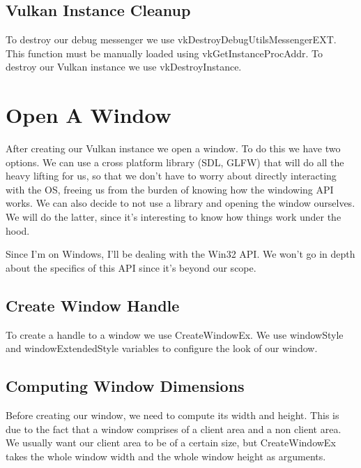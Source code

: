 \subsection{Vulkan Instance Cleanup}

To destroy our debug messenger we use vkDestroyDebugUtilsMessengerEXT.
This function must be manually loaded using vkGetInstanceProcAddr.
To destroy our Vulkan instance we use vkDestroyInstance.

\section{Open A Window}

After creating our Vulkan instance we open a window.
To do this we have two options.
We can use a cross platform library (SDL, GLFW) that will do all the heavy lifting
for us, so that we don't have to worry about directly interacting with the OS,
freeing us from the burden of knowing how the windowing API works.
We can also decide to not use a library and opening the window ourselves.
We will do the latter, since it's interesting to know how things work under the hood.

Since I'm on Windows, I'll be dealing with the Win32 API.
We won't go in depth about the specifics of this API since it's beyond our scope.

\subsection{Create Window Handle}

To create a handle to a window we use CreateWindowEx.
We use windowStyle and windowExtendedStyle variables to configure the look of
our window.

\begin{minipage}{\linewidth}{\noindent}
    
\end{minipage}

\subsection{Computing Window Dimensions}

Before creating our window, we need to compute its width and height.
This is due to the fact that a window comprises of a client area and a non client area.
We usually want our client area to be of a certain size, but CreateWindowEx takes
the whole window width and the whole window height as arguments.

